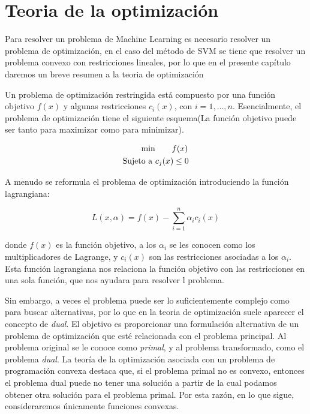 \documentclass[letterpaper,12pt,oneside]{book}
\begin{document}
{   \section{Teoria de la optimización}
   {
Para resolver un problema de Machine Learning es necesario resolver un problema de optimización, en el caso del método de SVM se tiene que resolver un problema convexo con restricciones lineales, por lo que en el presente capítulo daremos un breve resumen a la teoria de optimización   

Un problema de optimización restringida está compuesto por una función objetivo \( f(x) \) y algunas restricciones \( c_i(x) \), con \( i=1, \dots, n \). Esencialmente, el problema de optimización tiene el siguiente esquema(La función objetivo puede ser tanto para maximizar como para minimizar).

    
    \begin{align}
        \min & \qquad f(x) \\
        \text{Sujeto a } &c_j(x) \leq 0 \notag 
    \end{align}

    A menudo se reformula el problema de optimización introduciendo la función lagrangiana:

    \begin{equation}
         L(x, \alpha) = f(x) - \sum_{i=1}^{n} \alpha_i c_i(x)
    \end{equation}
    
    donde \( f(x) \) es la función objetivo, a los \( \alpha_i \) se les conocen como los multiplicadores de Lagrange, y \( c_i(x) \) son las restricciones asociadas a los \( \alpha_i \). Esta función lagrangiana nos relaciona la función objetivo con las restricciones en una sola función, que nos ayudara para resolver l problema.

Sin embargo, a veces el problema puede ser lo suficientemente complejo como para buscar alternativas, por lo que en la teoria de optimización suele aparecer el concepto de \textit{dual}. El objetivo es proporcionar una formulación alternativa de un problema de optimización que esté relacionada con el problema principal. Al problema original se le conoce como \textit{primal}, y al problema transformado, como el problema \textit{dual}. La teoría de la optimización asociada con un problema de programación convexa destaca que, si el problema primal no es convexo, entonces el problema dual puede no tener una solución a partir de la cual podamos obtener otra solución para el problema primal. Por esta razón, en lo que sigue, consideraremos únicamente funciones convexas.


}}
\end{document}
